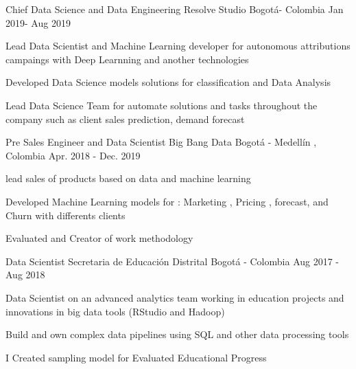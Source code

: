 \begin{cventries}
  \cventry
    {Chief Data Science and Data Engineering } %
    {Resolve Studio} %
    {Bogotá- Colombia} %
    {Jan 2019- Aug 2019} %
    {
      \begin{cvitems} %
        \item {Lead Data Scientist and Machine Learning developer for autonomous attributions campaings with Deep Learnning and another technologies}
        \item {Developed  Data Science models solutions  for classification and Data Analysis}
        \item{Lead Data Science Team  for automate solutions and tasks throughout the company such as client sales prediction, demand forecast}
      \end{cvitems}
    }

  \cventry
    {Pre Sales Engineer and Data Scientist} %
    {Big Bang Data} %
    {Bogotá - Medellín , Colombia} %
    {Apr. 2018 - Dec. 2019} %
    {
      \begin{cvitems} %
        \item {lead sales of products based on data and machine learning}
        \item {Developed Machine Learning models for : Marketing , Pricing , forecast, and Churn with differents clients}
        \item {Evaluated and Creator of work methodology}
      \end{cvitems}
    }
    


    \cventry
    {Data Scientist }%
    {Secretaria de Educación Distrital} %
    {Bogotá - Colombia} %
    {Aug 2017 - Aug 2018} %
    {
    \begin{cvitems} 
     \item {Data Scientist on an advanced analytics team working in education projects and innovations in big data tools (RStudio and Hadoop)}
      \item {Build and own complex data pipelines using SQL and other data processing tools}
       \item {I Created sampling model for Evaluated Educational Progress}
       \end{cvitems}
    }



\end{cventries}
